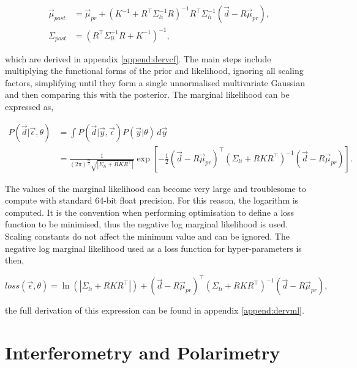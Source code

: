 \begin{align}
\label{eq:mupost}
\vec{\mu}_{post} &= \vec{\mu}_{pr} + (K^{-1} + R^{\top} \Sigma_{li}^{-1} R)^{-1} R^{\top} \Sigma_{li}^{-1} (\vec{d} - R \vec{\mu}_{pr}),\\
\label{eq:covpost}
\Sigma_{post} &= \left(R^\top \Sigma_{li}^{-1} R + K^{-1}\right)^{-1},
\end{align}

\noindent which are derived in appendix \ref{append:dervcf}. The main steps include multiplying the functional forms of the prior and likelihood, ignoring all scaling factors, simplifying until they form a single unnormalised multivariate Gaussian and then comparing this with the posterior. The marginal likelihood can be expressed as,

\begin{equation}
\begin{aligned}
 P(\vec d|\vec\epsilon,\theta) &= \int P(\vec{d}|\vec{y},\vec\epsilon)P(\vec{y}|\theta)  \, d\vec y \\
 &= \frac{1}{(2\pi)^{\frac{m}{2}} \sqrt{|\Sigma_{li} + RKR^\top|}} \exp\left[ -\frac{1}{2} (\vec{d} - R\vec{\mu}_{pr})^{\top} (\Sigma_{li} + R K R^{\top})^{-1} (\vec{d} - R\vec{\mu}_{pr}) \right].
\end{aligned}
\end{equation}

\noindent The values of the marginal likelihood can become very large and troublesome to compute with standard 64-bit float precision. For this reason, the logarithm is computed. It is the convention when performing optimisation to define a loss function to be minimised, thus the negative log marginal likelihood is used. Scaling constants do not affect the minimum value and can be ignored. The negative log marginal likelihood used as a loss function for hyper-parameters is then,

\begin{equation}
loss(\vec \epsilon,\theta) = \ln(|\Sigma_{li}+RKR^\top|) +  (\vec{d} - R\vec{\mu}_{pr})^{\top} (\Sigma_{li} + R K R^{\top})^{-1} (\vec{d} - R\vec{\mu}_{pr}),
\end{equation}

\noindent the full derivation of this expression can be found in appendix \ref{append:dervml}.


\section{Interferometry and Polarimetry}

